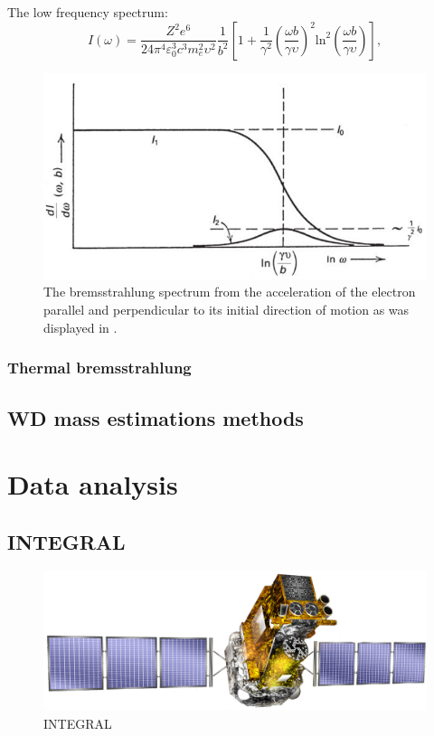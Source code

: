 \documentclass[oneside,a4paper,11pt]{report}
\begin{document}
The low frequency spectrum: 
\begin{equation}
 \label{low_f}
I(\omega) = \frac{Z^2 e^6}{24 \pi^4 \varepsilon_0^3 c^3 m_e^2 \upsilon^2 } \frac{1}{b^2} \left [ 1 + \frac{1}{\gamma^2} \left ( \frac{\omega b}{\gamma \upsilon} \right )^2 \mathrm{ln}^2 \left ( \frac{\omega b}{\gamma \upsilon} \right ) \right ],
\end{equation}


\begin{figure}[hbt]
\centering
\includegraphics[totalheight=5cm]{plot/brem_jackson}
\caption{The bremsstrahlung spectrum from the acceleration of the electron parallel and perpendicular
to its initial direction of motion as was displayed in \citet{jackson}.}
\label{jackson_brem} 
\end{figure}


\subsection{Thermal bremsstrahlung}




\section{WD mass estimations methods}


\chapter{Data analysis}

\section{INTEGRAL}

\begin{figure}[!hbt]
\centering
\includegraphics[totalheight=4cm]{integral}
\caption{INTEGRAL}
\label{microblazar} 
\end{figure}
\end{document}
